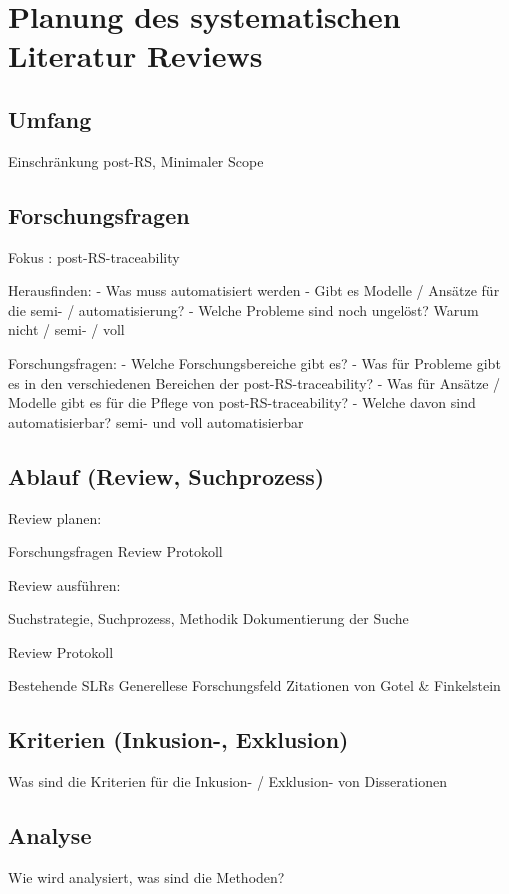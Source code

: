 \section{Planung des systematischen Literatur Reviews}
\subsection{Umfang}

Einschränkung post-RS, Minimaler Scope

\subsection{Forschungsfragen}

Fokus : post-RS-traceability

Herausfinden:
- Was muss automatisiert werden
- Gibt es Modelle / Ansätze für die semi- / automatisierung?
- Welche Probleme sind noch ungelöst? Warum nicht / semi- / voll

Forschungsfragen:
- Welche Forschungsbereiche gibt es?
- Was für Probleme gibt es in den verschiedenen Bereichen der post-RS-traceability?
- Was für Ansätze / Modelle gibt es für die Pflege von post-RS-traceability?
- Welche davon sind automatisierbar? semi- und voll automatisierbar

\subsection{Ablauf (Review, Suchprozess)}

Review planen:

Forschungsfragen
Review Protokoll

Review ausführen:

Suchstrategie, Suchprozess, Methodik
Dokumentierung der Suche

Review Protokoll

Bestehende SLRs
Generellese Forschungsfeld
Zitationen von Gotel \& Finkelstein

\subsection{Kriterien (Inkusion-, Exklusion)}

Was sind die Kriterien für die Inkusion- / Exklusion- von Disserationen

\subsection{Analyse}

Wie wird analysiert, was sind die Methoden?


